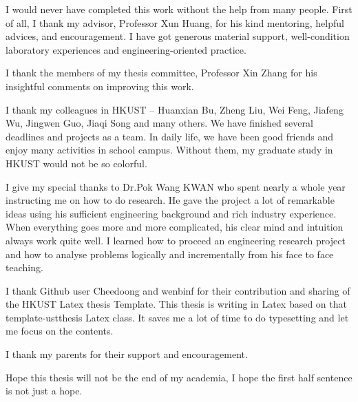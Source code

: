 \acknowledgments
I would never have completed this work without the help from many people. First of all, I thank my advisor, Professor Xun Huang, for his kind mentoring, helpful advices, and encouragement. I have got generous material support, well-condition laboratory experiences and engineering-oriented practice.  

I thank the members of my thesis committee, Professor Xin Zhang for his insightful comments on improving this work. 

I thank my colleagues in HKUST -- Huanxian Bu, Zheng Liu, Wei Feng, Jiafeng Wu, Jingwen Guo, Jiaqi Song and many others. We have finished several deadlines and projects as a team. In daily life, we have been good friends and enjoy many activities in school campus. Without them, my graduate study in HKUST would not be so colorful. 

I give my special thanks to Dr.Pok Wang KWAN who spent nearly a whole year instructing me on how to do research. He gave the project a lot of remarkable ideas using his sufficient engineering background and rich industry experience. When everything goes more and more complicated, his clear mind and intuition always work quite well. I learned how to proceed an engineering research project and how to analyse problems logically and incrementally from his face to face teaching.

I thank Github user Cheedoong and wenbinf for their contribution and sharing of the HKUST Latex thesis Template. This thesis is writing in Latex based on that template-ustthesis Latex class. It saves me a lot of time to do typesetting and let me focus on the contents.   

I thank my parents for their support and encouragement. 

Hope this thesis will not be the end of my academia, I hope the first half sentence is not just a hope.

\endacknowledgments
